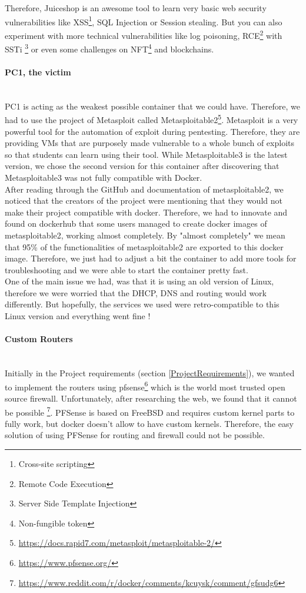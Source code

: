 \documentclass[a4paper,11pt,singlespacing]{article}
\begin{document}
Therefore, Juiceshop is an awesome tool to learn very basic web security vulnerabilities like XSS\footnote{Cross-site scripting}, SQL Injection or Session stealing. But you can also experiment with more technical vulnerabilities like log poisoning, RCE\footnote{Remote Code Execution} with SSTi \footnote{Server Side Template Injection} or even some challenges on NFT\footnote{Non-fungible token} and blockchains.\\

\paragraph{PC1, the victim}
\leavevmode\\
PC1 is acting as the weakest possible container that we could have. Therefore, we had to use the project of Metasploit called Metasploitable2\footnote{\url{https://docs.rapid7.com/metasploit/metasploitable-2/}}. Metasploit is a very powerful tool for the automation of exploit during pentesting. Therefore, they are providing VMs that are purposely made vulnerable to a whole bunch of exploits so that students can learn using their tool. While Metasploitable3 is the latest version, we chose the second version for this container after discovering that Metasploitable3 was not fully compatible with Docker.\\

After reading through the GitHub and documentation of metasploitable2, we noticed that the creators of the project were mentioning that they would not make their project compatible with docker. Therefore, we had to innovate and found on dockerhub that some users managed to create docker images of metasploitable2, working almost completely. By "almost completely" we mean that 95\% of the functionalities of metasploitable2 are exported to this docker image. Therefore, we just had to adjust a bit the container to add more tools for troubleshooting and we were able to start the container pretty fast.\\

One of the main issue we had, was that it is using an old version of Linux, therefore we were worried that the DHCP, DNS and routing would work differently. But hopefully, the services we used were retro-compatible to this Linux version and everything went fine !\\

\paragraph{Custom Routers}
\leavevmode\\
Initially in the Project requirements (section \ref{ProjectRequirements}), we wanted to implement the routers using pfsense\footnote{\url{https://www.pfsense.org/}} which is the world most trusted open source firewall. Unfortunately, after researching the web, we found that it cannot be possible \footnote{\url{https://www.reddit.com/r/docker/comments/kcuysk/comment/gfsudg6}}. PFSense is based on FreeBSD and requires custom kernel parts to fully work, but docker doesn't allow to have custom kernels. Therefore, the easy solution of using PFSense for routing and firewall could not be possible.\\
\end{document}
